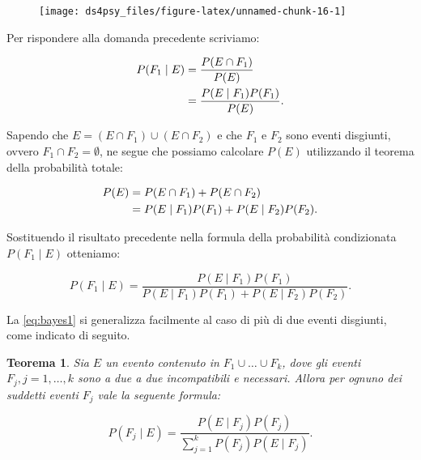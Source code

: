 \documentclass[
  11pt,
]{krantz}
\newtheorem{theorem}{Teorema}[chapter]
\theoremstyle{definition}
\theoremstyle{definition}
\theoremstyle{definition}
\theoremstyle{definition}
\theoremstyle{remark}
\begin{document}
\begin{figure}[h]

{\centering \texttt{[image: ds4psy\_files/figure-latex/unnamed-chunk-16-1]} 

}

\end{figure}

Per rispondere alla domanda precedente scriviamo:

\[
\begin{split}
P(F_1 \mid E) &= \frac{P(E \cap F_1)}{P(E)}\notag\\
              &= \frac{P(E \mid F_1)P(F_1)}{P(E)}.
\end{split}
\]

Sapendo che \(E = (E \cap F_1) \cup (E \cap F_2)\) e che \(F_1\) e \(F_2\) sono eventi disgiunti, ovvero \(F_1 \cap F_2 = \emptyset\), ne segue che possiamo calcolare \(P(E)\) utilizzando il teorema della probabilità totale:

\[
\begin{split}
P(E) &= P(E \cap F_1) + P(E \cap F_2)\notag\\
     &= P(E \mid F_1)P(F_1) + P(E \mid F_2)P(F_2).
\end{split}
\]

\noindent Sostituendo il risultato precedente nella formula della probabilità condizionata \(P(F_1 \mid E)\) otteniamo:

\begin{equation}
P(F_1 \mid E) = \frac{P(E \mid F_1)P(F_1)}{P(E \mid F_1)P(F_1) + P(E \mid F_2)P(F_2)}.
\label{eq:bayes1}
\end{equation}

\noindent La \eqref{eq:bayes1} si generalizza facilmente al caso di più di due eventi disgiunti, come indicato di seguito.

\begin{theorem}
Sia \(E\) un evento contenuto in \(F_1 \cup \dots \cup F_k\), dove gli eventi \(F_j, j=1, \dots, k\) sono a due a due incompatibili e necessari. Allora per ognuno dei suddetti eventi \(F_j\) vale la seguente formula:

\begin{equation}
P(F_j \mid E) = \frac{P(E \mid F_j)P(F_j)}{\sum_{j=1}^{k}P(F_j)P(E \mid F_j)}.
\label{eq:bayes2}
\end{equation}
\end{theorem}
\end{document}
